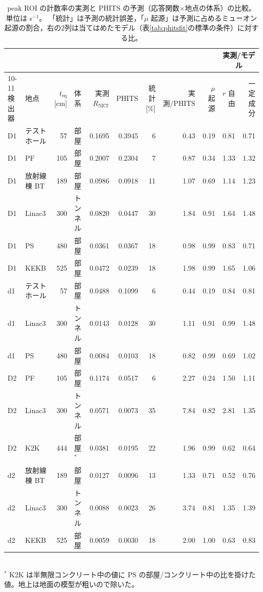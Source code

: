 \documentclass[a4paper,11pt]{ltjsarticle}
\newcommand{\teq}{t_{\mathrm{eq}}}
\newcommand{\RNET}{R_{\mathrm{NET}}}
\begin{document}
\begin{table}[htbp]
  \centering
  \caption{peak ROI の計数率の実測と PHITS の予測（応答関数×地点の体系）の比較。単位は s$^{-1}$。
  「統計」は予測の統計誤差，「$\mu$ 起源」は予測に占めるミューオン起源の割合，右の2列は当てはめたモデル（表\ref{tab:phitsfit}の標準の条件）に対する比。}
  \label{tab:phitsmodel}
  \footnotesize
  \setlength{\tabcolsep}{3.6pt}
  \begin{tabular}{llrlrrrrrrr}
    \toprule
    & & & & & & & & & \multicolumn{2}{c}{実測/モデル} \\
    \cmidrule(lr){10-11}
    検出器 & 地点 & $\teq$ [cm] & 体系 & 実測 $\RNET$ & PHITS & 統計 [\%] & 実測/PHITS & $\mu$ 起源 & $r$ 自由 & 一定成分 \\
    \midrule
    D1 & テストホール & 57 & 部屋 & 0.1695 & 0.3945 & 6 & 0.43 & 0.19 & 0.81 & 0.71 \\
    D1 & PF & 105 & 部屋 & 0.2007 & 0.2304 & 7 & 0.87 & 0.34 & 1.33 & 1.32 \\
    D1 & 放射線棟 BT & 189 & 部屋 & 0.0986 & 0.0918 & 11 & 1.07 & 0.69 & 1.14 & 1.23 \\
    D1 & Linac3 & 300 & トンネル & 0.0820 & 0.0447 & 30 & 1.84 & 0.91 & 1.64 & 1.48 \\
    D1 & PS & 480 & 部屋 & 0.0361 & 0.0367 & 18 & 0.98 & 0.99 & 0.83 & 0.71 \\
    D1 & KEKB & 525 & 部屋 & 0.0472 & 0.0239 & 18 & 1.98 & 0.99 & 1.65 & 1.06 \\
    d1 & テストホール & 57 & 部屋 & 0.0488 & 0.1099 & 6 & 0.44 & 0.19 & 0.84 & 0.81 \\
    d1 & Linac3 & 300 & トンネル & 0.0143 & 0.0128 & 30 & 1.11 & 0.91 & 0.99 & 1.48 \\
    d1 & PS & 480 & 部屋 & 0.0084 & 0.0103 & 18 & 0.82 & 0.99 & 0.69 & 1.02 \\
    D2 & PF & 105 & 部屋 & 0.1174 & 0.0517 & 6 & 2.27 & 0.24 & 1.50 & 1.11 \\
    D2 & Linac3 & 300 & トンネル & 0.0571 & 0.0073 & 35 & 7.84 & 0.82 & 2.81 & 1.35 \\
    D2 & K2K & 444 & 部屋$^{*}$ & 0.0381 & 0.0195 & 22 & 1.96 & 0.99 & 0.62 & 0.64 \\
    d2 & 放射線棟 BT & 189 & 部屋 & 0.0127 & 0.0096 & 13 & 1.33 & 0.71 & 0.52 & 0.76 \\
    d2 & Linac3 & 300 & トンネル & 0.0088 & 0.0023 & 26 & 3.74 & 0.81 & 1.35 & 1.39 \\
    d2 & KEKB & 525 & 部屋 & 0.0059 & 0.0030 & 18 & 2.00 & 1.00 & 0.63 & 0.83 \\
    \bottomrule
  \end{tabular}\\[2pt]
  \footnotesize $^{*}$ K2K は半無限コンクリート中の値に PS の部屋/コンクリート中の比を掛けた値。地上は地面の模型が粗いので除いた。
\end{table}
\end{document}
